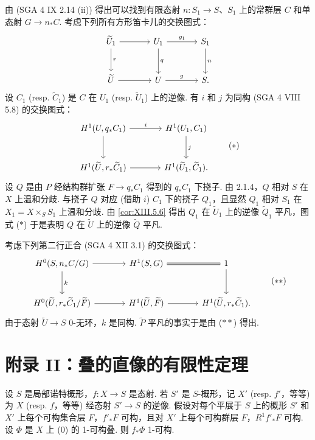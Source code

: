 由 (SGA 4 IX 2.14 (ii)) 得出可以找到有限态射 $n \colon S_1 \to S$、$S_1$ 上的常群层 $C$ 和单态射 $G \to n_* C$. 考虑下列所有方形笛卡儿的交换图式：
\[
\begin{tikzcd}[row sep=large, column sep=large]
\widetilde{U}_1 \arrow[r] \arrow[d,"{r}"] & U_1 \arrow[r,"{g_1}"] \arrow[d,"{q}"] & S_1 \arrow[d,"{n}"] \\
\widetilde{U} \arrow[r] & U \arrow[r,"{g}"] & S.
\end{tikzcd}
\]
设 $C_1$ (resp. $\widetilde{C}_1$) 是 $C$ 在 $U_1$ (resp. $\widetilde{U}_1$) 上的逆像. 有 $i$ 和 $j$ 为同构 (SGA 4 VIII 5.8) 的交换图式：
\begin{equation}
\begin{tikzcd}[row sep=large, column sep=large]
H^1(U, q_* C_1) \arrow[r,"{i}"] \arrow[d] & H^1(U_1, C_1) \arrow[d,"{j}"] \\
H^1(\widetilde{U}, r_* \widetilde{C}_1) \arrow[r] & H^1(\widetilde{U}_1, \widetilde{C}_1).
\end{tikzcd}
\tag{$\ast$}
\end{equation}
设 $Q$ 是由 $P$ 经结构群扩张 $F \to q_* C_1$ 得到的 $q_* C_1$ 下挠子. 由 2.1.4，$Q$ 相对 $S$ 在 $X$ 上温和分歧. 与挠子 $Q$ 对应 (借助 $i$) $C_1$ 下的挠子 $Q_1$，且显然 $Q_1$ 相对 $S_1$ 在 $X_1 = X \times_S S_1$ 上温和分歧. 由 \ref{cor:XIII.5.6} 得出 $Q_1$ 在 $\widetilde{U}_1$ 上的逆像 $\widetilde{Q}_1$ 平凡，图式 ($\ast$) 于是表明 $Q$ 在 $\widetilde{U}$ 上的逆像 $\widetilde{Q}$ 平凡.

考虑下列第二行正合 (SGA 4 XII 3.1) 的交换图式：
\begin{equation}
\begin{tikzcd}[row sep=large, column sep=large]
H^0(S, n_* C/G) \arrow[r] \arrow[d,"{k}"] & H^1(S, G) \arrow[r, equal] & 1 \arrow[d] \\
H^0(\widetilde{U}, r_* \widetilde{C}_1/\widetilde{F}) \arrow[r] & H^1(\widetilde{U}, \widetilde{F}) \arrow[r] & H^1(\widetilde{U}, r_* \widetilde{C}_1).
\end{tikzcd}
\tag{$\ast\ast$}
\end{equation}
由于态射 $\widetilde{U} \to S$ 0-无环，$k$ 是同构. $\widetilde{P}$ 平凡的事实于是由 ($\ast\ast$) 得出.

\section{附录 II：叠的直像的有限性定理}

\begin{proposition}\label{prop:XIII.6.1}
设 $S$ 是局部诺特概形，$f \colon X \to S$ 是态射. 若 $S'$ 是 $S$-概形，记 $X'$ (resp. $f'$，等等) 为 $X$ (resp. $f$，等等) 经态射 $S' \to S$ 的逆像. 假设对每个平展于 $S$ 上的概形 $S'$ 和 $X'$ 上每个可构集合层 $F$，$f'_* F$ 可构，且对 $X'$ 上每个可构群层 $F$，$R^1 f'_* F$ 可构. 设 $\Phi$ 是 $X$ 上 (0) 的 1-可构叠. 则 $f_* \Phi$ 1-可构.
\end{proposition}

